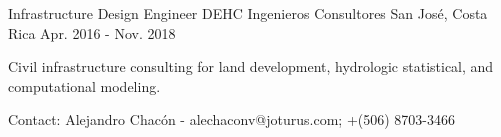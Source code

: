 \begin{cventries}
  \cventry
    {Infrastructure Design Engineer} %
    {DEHC Ingenieros Consultores} %
    {San José, Costa Rica} %
    {Apr. 2016 - Nov. 2018} %
    {
      \begin{cvitems} %
        \item {Civil infrastructure consulting for land development, hydrologic statistical, and computational modeling.}
        \item {Contact: Alejandro Chacón - alechaconv@joturus.com; +(506) 8703-3466}
      \end{cvitems}
    }

\end{cventries}